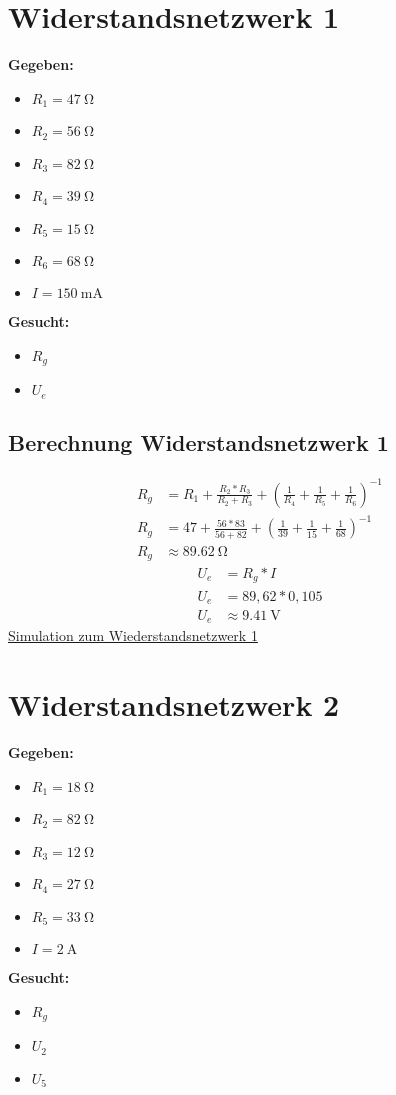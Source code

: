 \documentclass[12pt,a4paper]{amsart}
\begin{document}
\section{Widerstandsnetzwerk 1}
\textbf{Gegeben:}
\begin{itemize}
\item $R_1 = \qty{47}{\ohm}$
\item $R_2 = \qty{56}{\ohm}$
\item $R_3 = \qty{82}{\ohm}$
\item $R_4 = \qty{39}{\ohm}$
\item $R_5 = \qty{15}{\ohm}$
\item $R_6 = \qty{68}{\ohm}$
\item $I = \qty{150}{\mA}$
\end{itemize}
\textbf{Gesucht:}
\begin{itemize}
\item $R_g$
\item $U_e$
\end{itemize}
\subsection{Berechnung Widerstandsnetzwerk 1}
\begin{align*}
  R_g&=R_1+\frac{R_2*R_3}{R_2+R_3}+\left(\frac{1}{R_4}+\frac{1}{R_5}+\frac{1}{R_6}\right)^{-1}\\
  R_g&=47+\frac{56*83}{56+82}+\left(\frac{1}{39}+\frac{1}{15}+\frac{1}{68}\right)^{-1}\\
  R_g&\approx \qty{89.62}{\ohm}
\end{align*}
\begin{align*}
  U_e&=R_g*I\\
  U_e&=89,62*0,105\\
  U_e&\approx \qty{9.41}{\volt}
\end{align*}
\href{https://www.falstad.com/circuit/circuitjs.html?ctz=CQAgjCAMB0l3BWKIAsEkoMwgQUwLRhgBQAbiJgEySpwiEBstNLtIAnNGnOw+wOwIAHMhbQExAE7hKIyihoo5C5Cn7FM-GoxDzFymhBZTdkOUJFhZui8iGUT1S+0oznrmggaPbmTEycKf2QGIUczcBQUG0so5Ex2HwNTZMMJAHcYyOjZVOJM3KCA2z0ofIpqXRVC0shyqhpShuYyzJ1SnQVjTKt3Nyru-sLegdaU8BdxsDi6gojSwLBJ2fGa+ZUVwL8A+dsVnSFtMACN+srDisbTtuOQC6o7weaLyn5XC7qAZwrH8Ctf1gAMwAhgAbT64YiUW6vd6GSYfKDQMCQDJ-OETDF1IA}{Simulation zum Wiederstandsnetzwerk 1}
\section{Widerstandsnetzwerk 2}
\textbf{Gegeben:}
\begin{itemize}
\item $R_1 = \qty{18}{\ohm}$
\item $R_2 = \qty{82}{\ohm}$
\item $R_3 = \qty{12}{\ohm}$
\item $R_4 = \qty{27}{\ohm}$
\item $R_5 = \qty{33}{\ohm}$
\item $I = \qty{2}{\ampere}$
\end{itemize}
\textbf{Gesucht:}
\begin{itemize}
\item $R_g$
\item $U_2$
\item $U_5$
\end{itemize}
\end{document}

